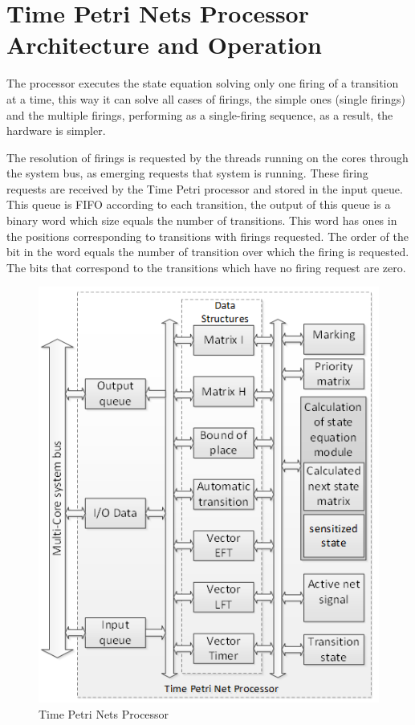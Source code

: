 \section{Time Petri Nets Processor Architecture and Operation}
	The processor executes the state equation solving only one firing of a transition at a time, this
	way it can solve all cases of firings, the simple ones (single firings) and the multiple firings, 
	performing as a single-firing sequence, as a result, the hardware is simpler.
	
	The resolution of firings is requested by the threads running on the cores through the system bus, 
	as emerging requests that system is running. These firing requests are received by the Time Petri 
	processor and stored in the input queue. This queue is FIFO according to each transition, the output 
	of this queue is a binary word which size equals the number of transitions. This word has ones in 
	the positions corresponding to transitions with firings requested. The order of the bit in the word 
	equals the number of transition over which the firing is requested. The bits that correspond to the 
	transitions which have no firing request are zero.
		
	\begin{figure}[h]
        \centering
        \includegraphics[width=0.95\linewidth]{./img/time_petri_nets_processor}
        \caption{Time Petri Nets Processor}
        \label{fig:time_petri_nets_processor}
    \end{figure}
    
